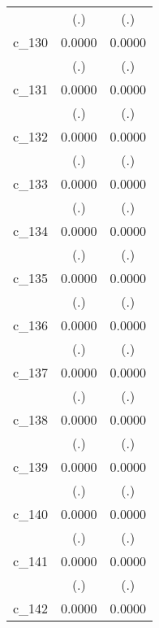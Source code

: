 {\begin{tabular}{l*{2}{c}}
            &         (.)        &         (.)        \\
[1em]
c\_130       &      0.0000        &      0.0000        \\
            &         (.)        &         (.)        \\
[1em]
c\_131       &      0.0000        &      0.0000        \\
            &         (.)        &         (.)        \\
[1em]
c\_132       &      0.0000        &      0.0000        \\
            &         (.)        &         (.)        \\
[1em]
c\_133       &      0.0000        &      0.0000        \\
            &         (.)        &         (.)        \\
[1em]
c\_134       &      0.0000        &      0.0000        \\
            &         (.)        &         (.)        \\
[1em]
c\_135       &      0.0000        &      0.0000        \\
            &         (.)        &         (.)        \\
[1em]
c\_136       &      0.0000        &      0.0000        \\
            &         (.)        &         (.)        \\
[1em]
c\_137       &      0.0000        &      0.0000        \\
            &         (.)        &         (.)        \\
[1em]
c\_138       &      0.0000        &      0.0000        \\
            &         (.)        &         (.)        \\
[1em]
c\_139       &      0.0000        &      0.0000        \\
            &         (.)        &         (.)        \\
[1em]
c\_140       &      0.0000        &      0.0000        \\
            &         (.)        &         (.)        \\
[1em]
c\_141       &      0.0000        &      0.0000        \\
            &         (.)        &         (.)        \\
[1em]
c\_142       &      0.0000        &      0.0000        \\

\end{tabular}}
